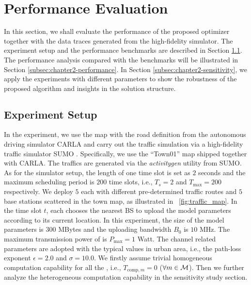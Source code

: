 

\section{Performance Evaluation}
\label{sec:chapter2-simulation}
In this section, we shall evaluate the performance of the proposed {\fwName} optimizer together with the data traces generated from the high-fidelity {\fwName} simulator.
The experiment setup and the performance benchmarks are described in Section \ref{subsec:chapter2-setup}.
The performance analysis compared with the benchmarks will be illustrated in Section \ref{subsec:chapter2-performance}.
In Section \ref{subsec:chapter2-sensitivity}, we apply the experiments with different parameters to show the robustness of the proposed algorithm and insights in the solution structure.

\subsection{Experiment Setup}
\label{subsec:chapter2-setup}
In the experiment, we use the map with the road definition from the autonomous driving simulator CARLA \cite{CARLA} and carry out the traffic simulation via a high-fidelity traffic simulator SUMO \cite{SUMO}. Specifically, we use the ``Town01'' map shipped together with CARLA.
The traffics are generated via the \emph{activitygen} utility from SUMO.
As for the {\fwName} simulator setup, the length of one time slot is set as $2$ seconds and the maximum scheduling period is $200$ time slots, i.e., $T_s=2$ and $T_{\max}=200$ respectively.
We deploy $5$ {\IAVs} each with different pre-determined traffic routes and $5$ base stations scattered in the town map, as illustrated in \figurename~\ref{fig:traffic_map}.
In the time slot $t$, each {\IAV} chooses the nearest BS to upload the model parameters according to its current location.
In this experiment, the size of the model parameters is $300$ MBytes and the uploading bandwidth $B_0$ is $10$ MHz.
The maximum transmission power of {\IAVs} is $P_{\max} = 1$ Watt.
The channel related parameters are adopted with the typical values in urban area, i.e., the path-loss exponent $\epsilon=2.0$ and $\sigma=10.0$.
We firstly assume trivial homogeneous computation capability for all the {\IAVs}, i.e., $T_{\text{comp},m}=0$ ($\forall m\in\mathcal{M}$).
Then we further analyze the heterogeneous computation capability in the sensitivity study section.

